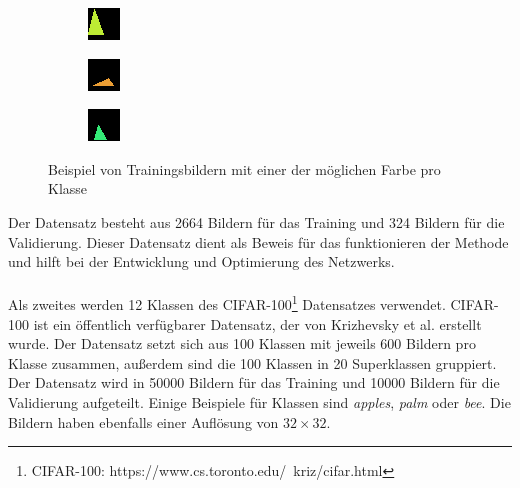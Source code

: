 \begin{figure}[H]
  \begin{subfigure}
    \centering
    \includegraphics[width=.15\textwidth]{resources/dataset/dummy/triangle41.png}
  \end{subfigure}
  \begin{subfigure}
    \centering
    \includegraphics[width=.15\textwidth]{resources/dataset/dummy/triangle49.png}
  \end{subfigure}
  \begin{subfigure}
    \centering
    \includegraphics[width=.15\textwidth]{resources/dataset/dummy/triangle51.png}
  \end{subfigure}
  \caption{Beispiel von Trainingsbildern mit einer der möglichen Farbe pro Klasse}
  \label{image:dummy}
\end{figure}

Der Datensatz besteht aus 2664 Bildern für das Training und 324 Bildern für die Validierung.
Dieser Datensatz dient als Beweis für das funktionieren der Methode und hilft bei der Entwicklung und Optimierung des Netzwerks.
\\
\\
Als zweites werden 12 Klassen des CIFAR-100\footnote{CIFAR-100: https://www.cs.toronto.edu/~kriz/cifar.html} Datensatzes verwendet. CIFAR-100 ist 
ein öffentlich verfügbarer Datensatz, der von Krizhevsky et al. erstellt wurde. Der Datensatz setzt sich aus 100 Klassen mit jeweils 600 
Bildern pro Klasse zusammen, außerdem sind die 100 Klassen in 20 Superklassen gruppiert. Der Datensatz wird in 50000 Bildern für das Training und 
10000 Bildern für die Validierung aufgeteilt. Einige Beispiele für Klassen sind \textit{apples}, \textit{palm} oder \textit{bee}. 
Die Bildern haben ebenfalls einer Auflösung von $ 32 \times 32 $.

